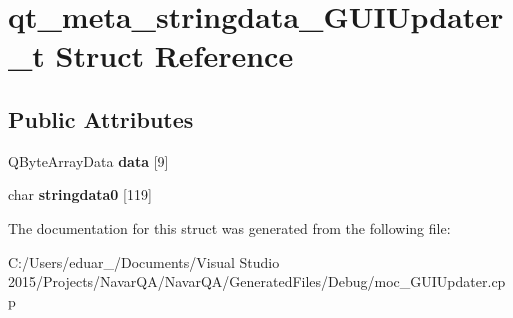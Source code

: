 \hypertarget{structqt__meta__stringdata___g_u_i_updater__t}{}\section{qt\+\_\+meta\+\_\+stringdata\+\_\+\+G\+U\+I\+Updater\+\_\+t Struct Reference}
\label{structqt__meta__stringdata___g_u_i_updater__t}
\subsection*{Public Attributes}
\begin{DoxyCompactItemize}
\item 
Q\+Byte\+Array\+Data {\bfseries data} \mbox{[}9\mbox{]}\hypertarget{structqt__meta__stringdata___g_u_i_updater__t_ad7ffa7f7e40232a6072953c340083c7c}{}\label{structqt__meta__stringdata___g_u_i_updater__t_ad7ffa7f7e40232a6072953c340083c7c}

\item 
char {\bfseries stringdata0} \mbox{[}119\mbox{]}\hypertarget{structqt__meta__stringdata___g_u_i_updater__t_ae431608bb6b8a869877e165c0d85e8ba}{}\label{structqt__meta__stringdata___g_u_i_updater__t_ae431608bb6b8a869877e165c0d85e8ba}

\end{DoxyCompactItemize}


The documentation for this struct was generated from the following file\+:\begin{DoxyCompactItemize}
\item 
C\+:/\+Users/eduar\+\_/\+Documents/\+Visual Studio 2015/\+Projects/\+Navar\+Q\+A/\+Navar\+Q\+A/\+Generated\+Files/\+Debug/moc\+\_\+\+G\+U\+I\+Updater.\+cpp\end{DoxyCompactItemize}
